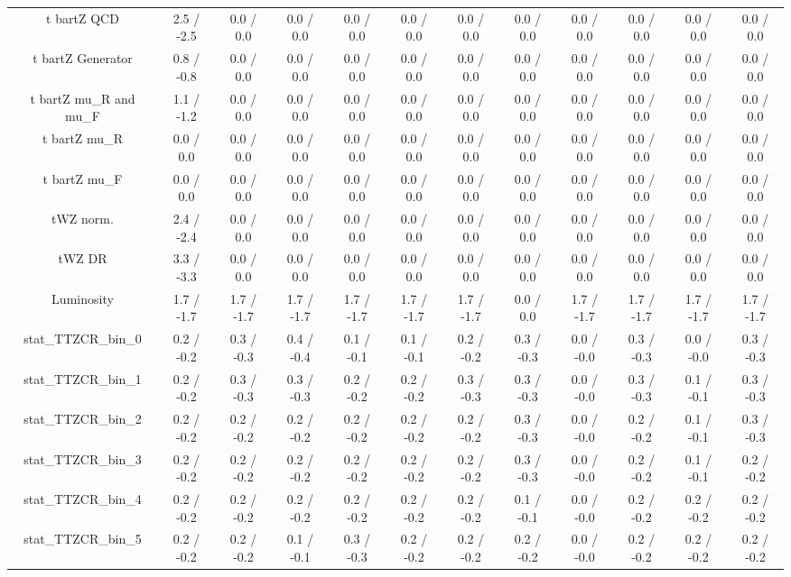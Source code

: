 \begin{table}[htbp]
\begin{center}
\begin{tabular}{|c|c|c|c|c|c|c|c|c|c|c|c|}
  t bar{t}Z QCD & 2.5 / -2.5 & 0.0 / 0.0 & 0.0 / 0.0 & 0.0 / 0.0 & 0.0 / 0.0 & 0.0 / 0.0 & 0.0 / 0.0 & 0.0 / 0.0 & 0.0 / 0.0 & 0.0 / 0.0 & 0.0 / 0.0 \\ 
  t bar{t}Z Generator & 0.8 / -0.8 & 0.0 / 0.0 & 0.0 / 0.0 & 0.0 / 0.0 & 0.0 / 0.0 & 0.0 / 0.0 & 0.0 / 0.0 & 0.0 / 0.0 & 0.0 / 0.0 & 0.0 / 0.0 & 0.0 / 0.0 \\ 
  t bar{t}Z  mu_{R} and  mu_{F} & 1.1 / -1.2 & 0.0 / 0.0 & 0.0 / 0.0 & 0.0 / 0.0 & 0.0 / 0.0 & 0.0 / 0.0 & 0.0 / 0.0 & 0.0 / 0.0 & 0.0 / 0.0 & 0.0 / 0.0 & 0.0 / 0.0 \\ 
  t bar{t}Z  mu_{R} & 0.0 / 0.0 & 0.0 / 0.0 & 0.0 / 0.0 & 0.0 / 0.0 & 0.0 / 0.0 & 0.0 / 0.0 & 0.0 / 0.0 & 0.0 / 0.0 & 0.0 / 0.0 & 0.0 / 0.0 & 0.0 / 0.0 \\ 
  t bar{t}Z  mu_{F} & 0.0 / 0.0 & 0.0 / 0.0 & 0.0 / 0.0 & 0.0 / 0.0 & 0.0 / 0.0 & 0.0 / 0.0 & 0.0 / 0.0 & 0.0 / 0.0 & 0.0 / 0.0 & 0.0 / 0.0 & 0.0 / 0.0 \\ 
  tWZ norm. & 2.4 / -2.4 & 0.0 / 0.0 & 0.0 / 0.0 & 0.0 / 0.0 & 0.0 / 0.0 & 0.0 / 0.0 & 0.0 / 0.0 & 0.0 / 0.0 & 0.0 / 0.0 & 0.0 / 0.0 & 0.0 / 0.0 \\ 
  tWZ DR & 3.3 / -3.3 & 0.0 / 0.0 & 0.0 / 0.0 & 0.0 / 0.0 & 0.0 / 0.0 & 0.0 / 0.0 & 0.0 / 0.0 & 0.0 / 0.0 & 0.0 / 0.0 & 0.0 / 0.0 & 0.0 / 0.0 \\ 
  Luminosity & 1.7 / -1.7 & 1.7 / -1.7 & 1.7 / -1.7 & 1.7 / -1.7 & 1.7 / -1.7 & 1.7 / -1.7 & 0.0 / 0.0 & 1.7 / -1.7 & 1.7 / -1.7 & 1.7 / -1.7 & 1.7 / -1.7 \\ 
 stat_TTZCR_bin_0 & 0.2 / -0.2 & 0.3 / -0.3 & 0.4 / -0.4 & 0.1 / -0.1 & 0.1 / -0.1 & 0.2 / -0.2 & 0.3 / -0.3 & 0.0 / -0.0 & 0.3 / -0.3 & 0.0 / -0.0 & 0.3 / -0.3 \\ 
 stat_TTZCR_bin_1 & 0.2 / -0.2 & 0.3 / -0.3 & 0.3 / -0.3 & 0.2 / -0.2 & 0.2 / -0.2 & 0.3 / -0.3 & 0.3 / -0.3 & 0.0 / -0.0 & 0.3 / -0.3 & 0.1 / -0.1 & 0.3 / -0.3 \\ 
 stat_TTZCR_bin_2 & 0.2 / -0.2 & 0.2 / -0.2 & 0.2 / -0.2 & 0.2 / -0.2 & 0.2 / -0.2 & 0.2 / -0.2 & 0.3 / -0.3 & 0.0 / -0.0 & 0.2 / -0.2 & 0.1 / -0.1 & 0.3 / -0.3 \\ 
 stat_TTZCR_bin_3 & 0.2 / -0.2 & 0.2 / -0.2 & 0.2 / -0.2 & 0.2 / -0.2 & 0.2 / -0.2 & 0.2 / -0.2 & 0.3 / -0.3 & 0.0 / -0.0 & 0.2 / -0.2 & 0.1 / -0.1 & 0.2 / -0.2 \\ 
 stat_TTZCR_bin_4 & 0.2 / -0.2 & 0.2 / -0.2 & 0.2 / -0.2 & 0.2 / -0.2 & 0.2 / -0.2 & 0.2 / -0.2 & 0.1 / -0.1 & 0.0 / -0.0 & 0.2 / -0.2 & 0.2 / -0.2 & 0.2 / -0.2 \\ 
 stat_TTZCR_bin_5 & 0.2 / -0.2 & 0.2 / -0.2 & 0.1 / -0.1 & 0.3 / -0.3 & 0.2 / -0.2 & 0.2 / -0.2 & 0.2 / -0.2 & 0.0 / -0.0 & 0.2 / -0.2 & 0.2 / -0.2 & 0.2 / -0.2 \\ 

\end{tabular}
\end{center}
\end{table}

